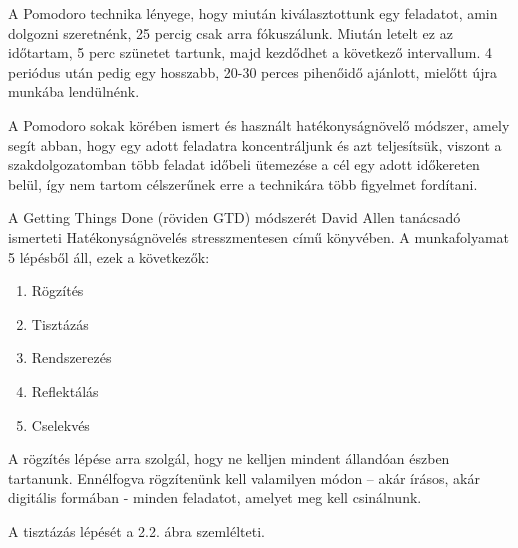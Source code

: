 
A Pomodoro technika lényege, hogy miután kiválasztottunk egy feladatot, amin dolgozni szeretnénk, 25 percig csak arra fókuszálunk. Miután letelt ez az időtartam, 5 perc szünetet tartunk, majd kezdődhet a következő intervallum. 4 periódus után pedig egy hosszabb, 20-30 perces pihenőidő ajánlott, mielőtt újra munkába lendülnénk.

A Pomodoro sokak körében ismert és használt hatékonyságnövelő módszer, amely segít abban, hogy egy adott feladatra koncentráljunk és azt teljesítsük, viszont a szakdolgozatomban több feladat időbeli ütemezése a cél egy adott időkereten belül, így nem tartom célszerűnek erre a technikára több figyelmet fordítani.


A Getting Things Done (röviden GTD) módszerét David Allen tanácsadó ismerteti Hatékonyságnövelés stresszmentesen című könyvében. A munkafolyamat 5 lépésből áll, ezek a következők:
\begin{enumerate}
\item Rögzítés
\item Tisztázás
\item Rendszerezés
\item Reflektálás
\item Cselekvés
\end{enumerate}

A rögzítés lépése arra szolgál, hogy ne kelljen mindent állandóan észben tartanunk. Ennélfogva rögzítenünk kell valamilyen módon – akár írásos, akár digitális formában - minden feladatot, amelyet meg kell csinálnunk.

A tisztázás lépését a 2.2. ábra szemlélteti.

